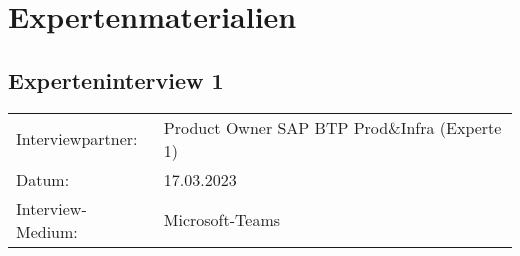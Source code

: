 \section{Expertenmaterialien}
\label{sec:Expertenmaterialien}
\newpage

\subsection{Experteninterview 1}
	\begin{tabular}{ l l }
		Interviewpartner: & Product Owner SAP BTP Prod\&Infra (Experte 1)\\
		Datum: & 17.03.2023\\
		Interview-Medium: & Microsoft-Teams\\
\end{tabular}\\\\

